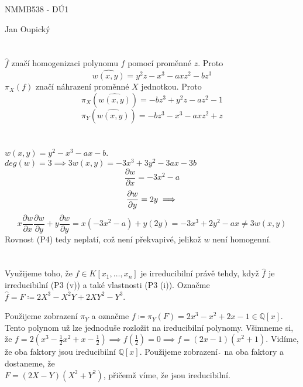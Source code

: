 \documentclass[12pt, a4paper]{article}
\begin{document}
\begin{center}
\large NMMB538 - DÚ1

\normalsize Jan Oupický
\end{center}
\vspace{1\baselineskip}

\section{}
$\hat{f}$ značí homogenizaci polynomu $f$ pomocí proměnné $z$. Proto
\[
\widehat{w(x,y)} = y^2 z - x^3 - a x z^2 - b z^3
\]
$\pi_X(f)$ značí náhrazení proměnné $X$ jednotkou. Proto
\[
\pi_X(\widehat{w(x,y)}) = - b z^3 + y^2 z - az^2 - 1
\]
\[
\pi_Y(\widehat{w(x,y)}) = - b z^3 - x^3 - a x z^2 + z
\]

\section{}
$w(x,y) = y^2-x^3-ax-b$. $deg(w) = 3 \implies 3w(x,y) = -3x^3+3y^2-3ax-3b$
\[
\frac{\partial w}{\partial x} = -3x^2-a
\]
\[
\frac{\partial w}{\partial y} = 2y\\\implies
\]
\[
x\frac{\partial w}{\partial x}\frac{\partial w}{\partial y} + y\frac{\partial w}{\partial y} = x(-3x^2-a)+y(2y) = -3x^3+2y^2-ax \neq 3w(x,y)
\]
Rovnost (P4) tedy neplatí, což není překvapivé, jelikož $w$ není homogenní.

\section{}
Využijeme toho, že $f \in K[x_1,\dots,x_n]$ je irreducibilní právě tehdy, když $\hat{f}$ je irreducibilní (P3 (v)) a také vlastnosti (P3 (i)). Označme $\hat{f} = F \coloneqq 2X^3-X^2Y+2XY^2-Y^3$. 

Použijeme zobrazení $\pi_Y$ a označme $f \coloneqq \pi_Y(F) = 2x^3-x^2+2x-1 \in \mathbb{Q}[x]$. Tento polynom už lze jednoduše rozložit na ireducibilní polynomy. Všimneme si, že $f = 2(x^3-\frac{1}{2}x^2+x-\frac{1}{2}) \implies f(\frac{1}{2}) = 0 \implies f = (2x-1)(x^2+1)$. Vidíme, že oba faktory jsou ireducibilní $\mathbb{Q}[x]$. Použijeme zobrazení $\hat{\,}$ na oba faktory a dostaneme, že\\ $F = (2X-Y)(X^2+Y^2)$, přičemž víme, že jsou ireducibilní.
\end{document}
